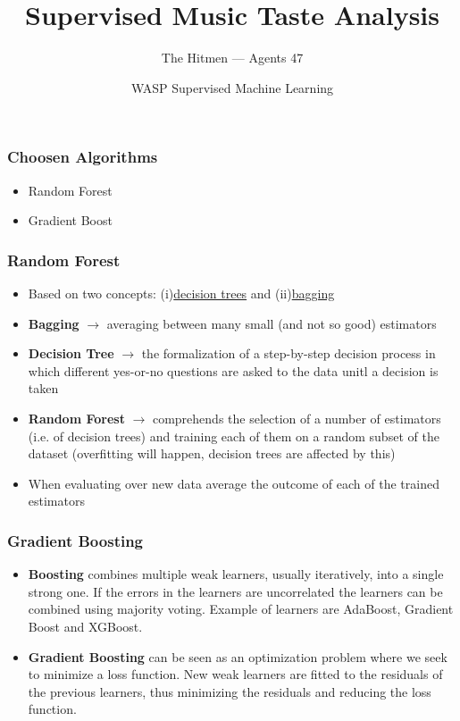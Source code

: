 \documentclass{beamer}
\title{Supervised Music Taste Analysis}
\date{WASP Supervised Machine Learning}
\author[Agents 47]{The Hitmen --- Agents 47}
\begin{document}
\begin{frame}
  \titlepage
\end{frame}


\begin{frame}
  \frametitle{Choosen Algorithms}
  \begin{itemize}
  \item Random Forest
  \item Gradient Boost
  \end{itemize}
\end{frame}

\begin{frame}
  \frametitle{Random Forest}
  \begin{itemize}
  \item Based on two concepts: (i)\underline{decision trees} and (ii)\underline{bagging}
  \item \textbf{Bagging} $\rightarrow$ averaging between many small (and not so good) estimators
  \item \textbf{Decision Tree} $\rightarrow$ the formalization of a step-by-step decision process in which different yes-or-no questions are asked to the data unitl a decision is taken
  \item \textbf{Random Forest} $\rightarrow$ comprehends the selection of a number of estimators (i.e. of decision trees) and training each of them on a random subset of the dataset (overfitting will happen, decision trees are affected by this)
  \item When evaluating over new data average the outcome of each of the trained estimators
  \end{itemize}
\end{frame}


\begin{frame}
  \frametitle{Gradient Boosting}
  \begin{itemize}
  \item \textbf{Boosting} combines multiple weak learners, usually iteratively, into a single strong one. If the errors in the learners are uncorrelated the learners can be combined using majority voting. Example of learners are AdaBoost, Gradient Boost and XGBoost.

  \item \textbf{Gradient Boosting} can be seen as an optimization problem where we seek to minimize a loss function. New weak learners are fitted to the residuals of the previous learners, thus minimizing the residuals and reducing the loss function.
  \end{itemize}
\end{frame}
\end{document}
